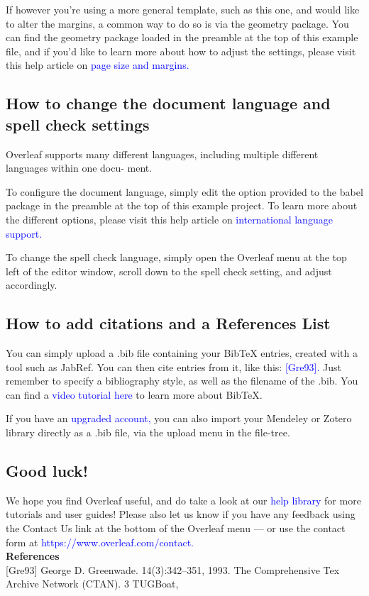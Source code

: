 \documentclass{article}
\begin{document}
        If however you’re using a more general template, such as this one, and would like to alter the
        margins, a common way to do so is via the geometry package. You can find the geometry package
        loaded in the preamble at the top of this example file, and if you’d like to learn more about how to
        adjust the settings, please visit this help article on \textcolor{blue}{page size and margins.}
        \subsection{How to change the document language and spell check settings}
        Overleaf supports many different languages, including multiple different languages within one docu-
        ment.
        
        To configure the document language, simply edit the option provided to the babel package in the
        preamble at the top of this example project. To learn more about the different options, please visit
        this help article on \textcolor{blue}{ international language support.}
        
        To change the spell check language, simply open the Overleaf menu at the top left of the editor
        window, scroll down to the spell check setting, and adjust accordingly.
        \subsection{How to add citations and a References List}
        You can simply upload a .bib file containing your BibTeX entries, created with a tool such as JabRef.
        You can then cite entries from it, like this:  \textcolor{blue}{[Gre93].} Just remember to specify a bibliography style, as
        well as the filename of the .bib. You can find a \textcolor{blue}{video tutorial here} to learn more about BibTeX.
        
        If you have an \textcolor{blue}{ upgraded account,} you can also import your Mendeley or Zotero library directly as
        a .bib file, via the upload menu in the file-tree.
        \subsection{Good luck!}
        We hope you find Overleaf useful, and do take a look at our \textcolor{blue}{help library} for more tutorials and user
        guides! Please also let us know if you have any feedback using the Contact Us link at the bottom of
        the Overleaf menu — or use the contact form at  \textcolor{blue}{https://www.overleaf.com/contact.}\\
        
        \textbf{\LARGE{References}}\\
        
        
        [Gre93] George D. Greenwade.
        14(3):342–351, 1993.
        The Comprehensive Tex Archive Network (CTAN).
        3
        TUGBoat,
        
         
 	   
 	   
 	   
 	    
 	
\end{document}
